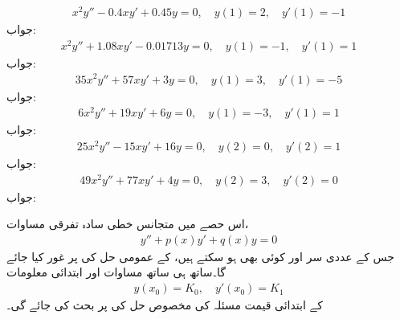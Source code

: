 \begin{align*}
x^2y''-0.4xy'+0.45y=0,\quad y(1)=2,\quad y'(1)=-1
\end{align*}
جواب:
\begin{align*}
x^2y''+1.08xy'-0.01713y=0,\quad y(1)=-1,\quad y'(1)=1
\end{align*}
جواب:
\begin{align*}
35x^2y''+57xy'+3y=0,\quad y(1)=3,\quad y'(1)=-5
\end{align*}
جواب:
\begin{align*}
6x^2y''+19xy'+6y=0,\quad y(1)=-3,\quad y'(1)=1
\end{align*}
جواب:
\begin{align*}
25x^2y''-15xy'+16y=0,\quad y(2)=0,\quad y'(2)=1
\end{align*}
جواب:
\begin{align*}
49x^2y''+77xy'+4y=0,\quad y(2)=3,\quad y'(2)=0
\end{align*}
جواب:

اس حصے میں متجانس خطی سادہ تفرقی مساوات،
\begin{align}\label{مساوات_سادہ_دو_وجودیت_مخصوص_الف}
y''+p(x)y'+q(x)y=0
\end{align}
جس کے عددی سر  اور  کوئی بھی  ہو سکتے  ہیں، کے عمومی حل کی  پر غور کیا جائے گا۔ساتھ ہی ساتھ مساوات  اور  ابتدائی معلومات
\begin{align}\label{مساوات_سادہ_دو_وجودیت_مخصوص_ب}
y(x_0)=K_0, \quad y'(x_0)=K_1
\end{align}
کے  ابتدائی قیمت مسئلہ کی مخصوص حل کی  پر بحث کی جائے گی۔ 

